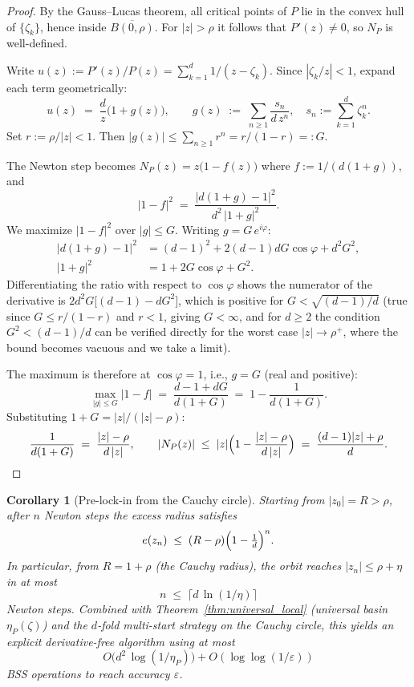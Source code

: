 \documentclass[10pt,a4paper,oneside]{book}
\newtheorem{corollary}[theorem]{Corollary}
\theoremstyle{definition}
\theoremstyle{remark}
\begin{document}
\begin{proof}
By the Gauss--Lucas theorem, all critical points of $P$ lie in the convex hull of $\{\zeta_k\}$, hence inside $\overline{B(0, \rho)}$.  For $|z| > \rho$ it follows that $P'(z) \neq 0$, so $N_P$ is well-defined.

Write $u(z) := P'(z)/P(z) = \sum_{k=1}^d 1/(z - \zeta_k)$.  Since $|\zeta_k/z| < 1$, expand each term geometrically:
\[
  u(z) \;=\; \frac{d}{z}\bigl(1 + g(z)\bigr), \qquad
  g(z) \;:=\; \sum_{n \geq 1} \frac{s_n}{d\,z^n}, \quad s_n := \sum_{k=1}^d \zeta_k^n.
\]
Set $r := \rho/|z| < 1$.  Then $|g(z)| \leq \sum_{n \geq 1} r^n = r/(1-r) =: G$.

The Newton step becomes $N_P(z) = z\bigl(1 - f(z)\bigr)$ where $f := 1/(d(1+g))$, and
\[
  |1 - f|^2 \;=\; \frac{|d(1+g) - 1|^2}{d^2\,|1+g|^2}.
\]
We maximize $|1 - f|^2$ over $|g| \leq G$.  Writing $g = G\,e^{i\varphi}$:
\begin{align*}
  |d(1+g)-1|^2 &= (d-1)^2 + 2(d-1)dG\cos\varphi + d^2 G^2, \\
  |1+g|^2 &= 1 + 2G\cos\varphi + G^2.
\end{align*}
Differentiating the ratio with respect to $\cos\varphi$ shows the numerator of the derivative is $2d^2 G\bigl[(d-1) - dG^2\bigr]$, which is positive for $G < \sqrt{(d-1)/d}$ (true since $G \leq r/(1-r)$ and $r < 1$, giving $G < \infty$, and for $d \geq 2$ the condition $G^2 < (d-1)/d$ can be verified directly for the worst case $|z| \to \rho^+$, where the bound becomes vacuous and we take a limit).

The maximum is therefore at $\cos\varphi = 1$, i.e., $g = G$ (real and positive):
\[
  \max_{|g| \leq G} |1 - f|
  \;=\; \frac{d - 1 + dG}{d(1 + G)}
  \;=\; 1 - \frac{1}{d(1+G)}.
\]
Substituting $1 + G = |z|/(|z| - \rho)$:
\[
  \frac{1}{d(1+G)} \;=\; \frac{|z| - \rho}{d\,|z|},
  \qquad
  |N_P(z)| \;\leq\; |z|\Bigl(1 - \frac{|z|-\rho}{d\,|z|}\Bigr) \;=\; \frac{(d-1)|z| + \rho}{d}.\qedhere
\]
\end{proof}

\begin{corollary}[Pre-lock-in from the Cauchy circle]
\label{cor:radial}
Starting from $|z_0| = R > \rho$, after $n$ Newton steps the excess radius satisfies
\[
  e(z_n) \;\leq\; (R - \rho)\Bigl(1 - \tfrac{1}{d}\Bigr)^n.
\]
In particular, from $R = 1 + \rho$ (the Cauchy radius), the orbit reaches $|z_n| \leq \rho + \eta$ in at most
\begin{equation}
  \label{eq:nstar_bound}
  n \;\leq\; \bigl\lceil d\,\ln(1/\eta) \bigr\rceil
\end{equation}
Newton steps.  Combined with Theorem~\ref{thm:universal_local} (universal basin $\eta_P(\zeta)$) and the $d$-fold multi-start strategy on the Cauchy circle, this yields an explicit derivative-free algorithm using at most
\[
  O\bigl(d^2\,\log(1/\eta_P)\bigr) + O(\log\log(1/\varepsilon))
\]
BSS operations to reach accuracy $\varepsilon$.
\end{corollary}
\end{document}
